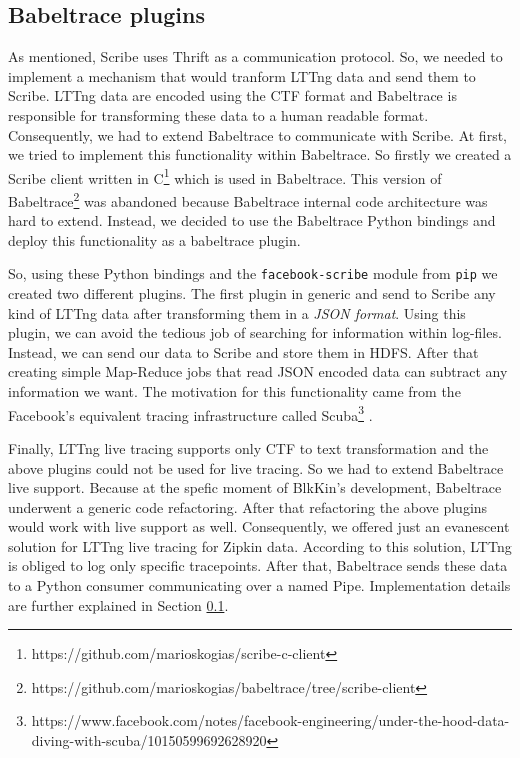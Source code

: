 \subsection{Babeltrace plugins}
As mentioned, Scribe uses Thrift as a communication protocol. So, we needed to
implement a mechanism that would tranform LTTng data and send them to Scribe.
LTTng data are encoded using the CTF format and Babeltrace is responsible for
transforming these data to a human readable format. Consequently, we had to
extend Babeltrace to communicate with Scribe. At first, we tried to implement
this functionality within Babeltrace. So firstly we created a Scribe client
written in C\footnote{https://github.com/marioskogias/scribe-c-client} which is
used in Babeltrace. This version of
Babeltrace\footnote{https://github.com/marioskogias/babeltrace/tree/scribe-client}
was abandoned because Babeltrace internal code architecture was hard to extend.
Instead, we decided to use the Babeltrace Python bindings and deploy this
functionality as a babeltrace plugin. 

So, using these Python bindings and the \texttt{facebook-scribe} module from
\texttt{pip} we created two different plugins. The first plugin in generic and
send to Scribe any kind of LTTng data after transforming them in a \textit{JSON
format}.  Using this plugin, we can avoid the tedious job of searching for
information within log-files. Instead, we can send our data to Scribe and store
them in HDFS. After that creating simple Map-Reduce jobs that read JSON encoded
data can subtract any information we want. The motivation for this functionality
came from the Facebook's equivalent tracing infrastructure called
Scuba\footnote{https://www.facebook.com/notes/facebook-engineering/under-the-hood-data-diving-with-scuba/10150599692628920}
\cite{scuba}. 

Finally, LTTng live tracing supports only CTF to text transformation and the
above plugins could not be used for live tracing. So we had to extend Babeltrace
live support. Because at the spefic moment of BlkKin's development, Babeltrace
underwent a generic code refactoring. After that refactoring the above plugins
would work with live support as well. Consequently, we offered just an
evanescent solution for LTTng live tracing for Zipkin data. According to this
solution, LTTng is obliged to log only specific tracepoints. After that,
Babeltrace sends these data to a Python consumer communicating over a named
Pipe. Implementation details are further explained in Section \ref{}.

